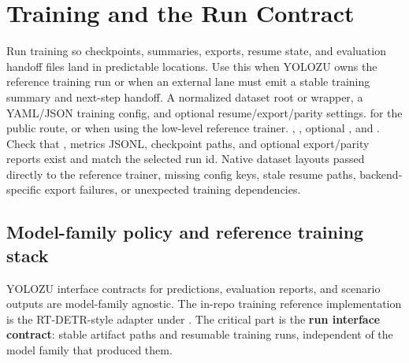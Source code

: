 \chapter{Training and the Run Contract}
\label{chap:training}


\WorkflowOpening
{Run training so checkpoints, summaries, exports, resume state, and evaluation handoff files land in predictable locations.}
{Use this when YOLOZU owns the reference training run or when an external lane must emit a stable training summary and next-step handoff.}
{A normalized dataset root or wrapper, a YAML/JSON training config, and optional resume/export/parity settings.}
{ for the public route, or  when using the low-level reference trainer.}
{, , optional , and .}
{Check that , metrics JSONL, checkpoint paths, and optional export/parity reports exist and match the selected run id.}
{Native dataset layouts passed directly to the reference trainer, missing config keys, stale resume paths, backend-specific export failures, or unexpected training dependencies.}

\section{Model-family policy and reference training stack}
YOLOZU interface contracts for predictions, evaluation reports, and scenario outputs are model-family agnostic. The in-repo training reference implementation is the RT-DETR-style adapter under . The critical part is the \textbf{run interface contract}: stable artifact paths and resumable training runs, independent of the model family that produced them.

